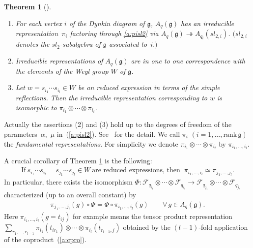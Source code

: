 \documentclass[11pt]{article}
\newtheorem{theorem}{Theorem}
\begin{document}
\begin{theorem}[\cite{So2,VS}]\label{a:th:so}
\qquad
\begin{enumerate}\itemsep=0pt
\item[$(1)$]  For each vertex $i$
of the Dynkin diagram of $\mathfrak{g}$,
$A_q(\mathfrak{g})$ has an irreducible
representa\-tion~$\pi_i$ factoring through
\eqref{a:pisl2} via
$A_q(\mathfrak{g}) \twoheadrightarrow
A_{q_i}(sl_{2,i})$.
$(sl_{2,i}$ denotes the $sl_2$-subalgebra of $\mathfrak{g}$
asso\-ciated to~$i.)$

\item[$(2)$] Irreducible representations of $A_q(\mathfrak{g})$ are
in one to one correspondence with the elements of the Weyl group
$W$ of $\mathfrak{g}$.

\item[$(3)$] Let $w =s_{i_1}\cdots s_{i_l} \in W$ be an
reduced expression in terms of the simple reflections.
Then the irreducible representation corresponding to $w$ is
isomorphic to $\pi_{i_1}\otimes \cdots \otimes \pi_{i_l}$.
\end{enumerate}
\end{theorem}

Actually the assertions (2) and (3) hold
up to the degrees of freedom of the parame\-ters~$\alpha$,~$\mu$ in~(\ref{a:pisl2}).
See~\cite{So2} for the detail.
We call $\pi_i$ $(i = 1,\ldots, \mathrm{rank}\, \mathfrak{g})$
the {\em fundamental representations}.
For simplicity we denote
$\pi_{i_1} \otimes \cdots \otimes \pi_{i_l}$
by $\pi_{i_1,\ldots, i_l}$.

A crucial corollary of Theorem \ref{a:th:so} is the following:
\begin{gather*}
\mathrm{If } \ s_{i_1}\cdots s_{i_l} = s_{j_1}\cdots s_{j_l}
\in W \
\text{are reduced expressions, then } \
\pi_{i_1, \ldots, i_l} \simeq \pi_{j_1, \ldots, j_l}.
\end{gather*}
In particular, there exists the isomorphism
$\Phi: \mathcal{F}_{q_{i_1}}\otimes \cdots \otimes \mathcal{F}_{q_{i_l}}
\rightarrow
\mathcal{F}_{q_{j_1}}\otimes \cdots \otimes \mathcal{F}_{q_{j_l}}$
characterized (up to an overall constant) by
\begin{gather*}
\pi_{j_1, \ldots, j_l}(g)\circ \Phi = \Phi \circ \pi_{i_1, \ldots, i_l}(g)\qquad
\forall\, g \in A_q(\mathfrak{g}).
\end{gather*}
Here $\pi_{i_1, \ldots, i_l}(g=t_{ij})$ for example
means the tensor product representation
$\sum_{r_1,\ldots, r_{l-1}}
\pi_{i_1}(t_{i r_1}) \otimes \cdots \otimes \pi_{i_l}(t_{r_{l-1},j})$
obtained by the $(l-1)$-fold application of the
coproduct~(\ref{a:cpro}).
\end{document}
